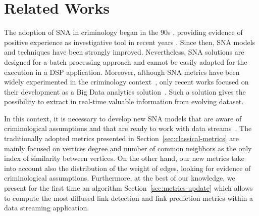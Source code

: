 \section{Related Works}
\label{sec:related-works}

The adoption of SNA in criminology began in the 90s \cite{berlusconi2017social}, providing evidence of positive experience as investigative tool in recent years \cite{van2009introduction}. 
%
Since then, SNA models and techniques have been strongly improved.
%
Nevertheless, SNA solutions are designed for a batch processing approach and cannot be easily adapted for the execution in a DSP application.
%
Moreover, although SNA metrics have been widely experimented in the criminology context~\cite{berlusconi2016link}, only recent works focused on their development as a Big Data analytics solution~\cite{pramanik2016framework}. Such a solution gives the possibility to extract in real-time valuable information from evolving dataset. 

In this context, it is necessary to develop new SNA models that are aware of criminological assumptions and that are ready to work with data streams~\cite{xu2005criminal,xu2004analyzing}.
%
The traditionally adopted metrics presented in Section~\ref{sec:classical-metrics} are mainly focused on vertices degree and number of common neighbors as the only index of similarity between vertices.
%
On the other hand, our new metrics take into account also the distribution of the weight of edges, looking for evidence of criminological assumptions.
%
Furthermore, at the best of our knowledge, we present for the first time an algorithm Section~\ref{sec:metrics-update} which allows to compute the most diffused link detection and link prediction metrics within a data streaming application.
